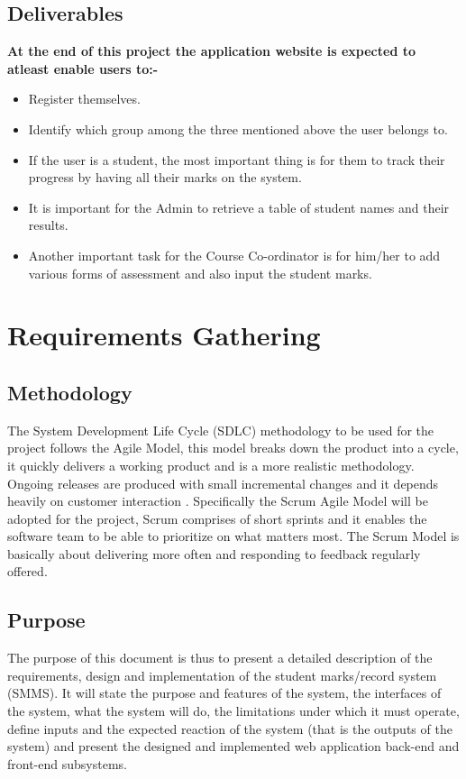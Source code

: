 \documentclass[10pt,onecolumn]{MainDocument}
\begin{document}
\subsection{Deliverables}

\textbf{At the end of this project the application website is expected to atleast enable users to:-}
\begin{itemize}
\item Register themselves.
\item Identify which group among the three mentioned above the user belongs to.
\item If the user is a student, the most important thing is for them to track their progress by having all their marks on the system.
\item It is important for the Admin to retrieve a table of student names and their results.
\item Another important task for the Course Co-ordinator is for him/her to add various forms of assessment and also input the student marks.
\end{itemize} 


\clearpage
\newpage
\section{Requirements Gathering}

\subsection{Methodology}

The System Development Life Cycle (SDLC) methodology to be used for the project follows the Agile Model, this model breaks down the product into a cycle, it quickly delivers a working product and is a more realistic methodology. Ongoing releases are produced with small incremental changes and it depends heavily on customer interaction \cite{ref7}. Specifically the Scrum Agile Model will be adopted for the project, Scrum comprises of short sprints and it enables the software team to be able to prioritize on what matters most. The Scrum Model is basically about delivering more often and responding to feedback regularly offered\cite{ref8}.           

\subsection{Purpose}

The purpose of this document is thus to present a detailed description of the requirements, design and implementation of the student marks/record system (SMMS). It will state the purpose and features of the system, the interfaces of the system, what the system will do, the limitations under which it must operate, define inputs and the expected reaction of the system (that is the outputs of the system) and present the designed and implemented web application back-end and front-end subsystems. 
\end{document}
